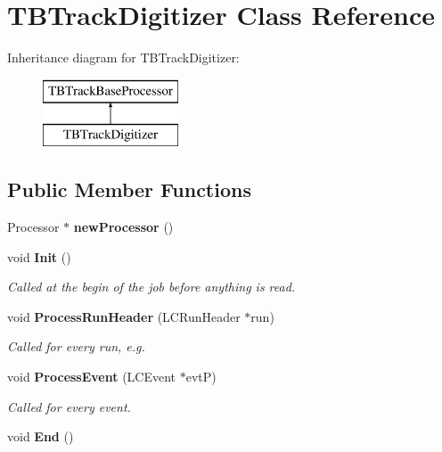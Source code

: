 \section{T\-B\-Track\-Digitizer Class Reference}
\label{classTBTrackDigitizer}
Inheritance diagram for T\-B\-Track\-Digitizer\-:\begin{figure}[H]
\begin{center}
\leavevmode
\includegraphics[height=2.000000cm]{classTBTrackDigitizer}
\end{center}
\end{figure}
\subsection*{Public Member Functions}
\begin{DoxyCompactItemize}
\item 
Processor $\ast$ {\bfseries new\-Processor} ()\label{classTBTrackDigitizer_a9b01b1d99677e61a302f5062511fdf03}

\item 
void {\bf Init} ()
\begin{DoxyCompactList}\small\item\em Called at the begin of the job before anything is read. \end{DoxyCompactList}\item 
void {\bf Process\-Run\-Header} (L\-C\-Run\-Header $\ast$run)
\begin{DoxyCompactList}\small\item\em Called for every run, e.\-g. \end{DoxyCompactList}\item 
void {\bf Process\-Event} (L\-C\-Event $\ast$evt\-P)\label{classTBTrackDigitizer_a026ff71a374a92b9f6ace5b858273896}

\begin{DoxyCompactList}\small\item\em Called for every event. \end{DoxyCompactList}\item 
void {\bfseries End} ()\label{classTBTrackDigitizer_a0a87ca69cc91c18f86b8f980c5b4e793}

\end{DoxyCompactItemize}
